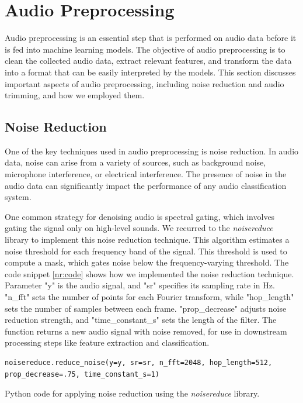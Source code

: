 \section{Audio Preprocessing}

Audio preprocessing is an essential step that is performed on audio data before it is fed into machine learning models. The objective of audio preprocessing is to clean the collected audio data, extract relevant features, and transform the data into a format that can be easily interpreted by the models. This section discusses important aspects of audio preprocessing, including noise reduction and audio trimming, and how we employed them.

\subsection{Noise Reduction}

One of the key techniques used in audio preprocessing is noise reduction. In audio data, noise can arise from a variety of sources, such as background noise, microphone interference, or electrical interference. The presence of noise in the audio data can significantly impact the performance of any audio classification system.

One common strategy for denoising audio is spectral gating, which involves gating the signal only on high-level sounds. We recurred to the \textit{noisereduce} library to implement this noise reduction technique.
This algorithm estimates a noise threshold for each frequency band of the signal. This threshold is used to compute a mask, which gates noise below the frequency-varying threshold. The code snippet \ref{nr:code} shows how we implemented the noise reduction technique. Parameter "y" is the audio signal, and "sr" specifies its sampling rate in Hz. "n\_fft" sets the number of points for each Fourier transform, while "hop\_length" sets the number of samples between each frame. "prop\_decrease" adjusts noise reduction strength, and "time\_constant\_s" sets the length of the filter. The function returns a new audio signal with noise removed, for use in downstream processing steps like feature extraction and classification.

\begin{listing}[H]
	\begin{verbatim}
noisereduce.reduce_noise(y=y, sr=sr, n_fft=2048, hop_length=512, prop_decrease=.75, time_constant_s=1)
	\end{verbatim}
	\caption{Python code for applying noise reduction using the \textit{noisereduce} library.}
	\label{nr:code}
\end{listing}

